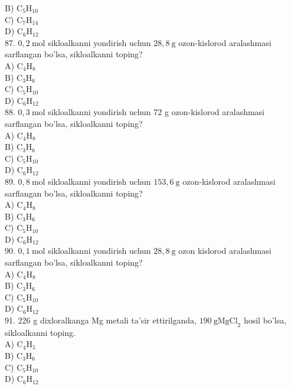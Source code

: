 B) $\mathrm{C}_{5} \mathrm{H}_{10}$\\
C) $\mathrm{C}_{7} \mathrm{H}_{14}$\\
D) $\mathrm{C}_{6} \mathrm{H}_{12}$\\
87. $0,2 \mathrm{~mol}$ sikloalkanni yondirish uchun $28,8 \mathrm{~g}$ ozon-kislorod aralashmasi sarflangan bo'lsa, sikloalkanni toping?\\
A) $\mathrm{C}_{4} \mathrm{H}_{8}$\\
B) $\mathrm{C}_{3} \mathrm{H}_{6}$\\
C) $\mathrm{C}_{5} \mathrm{H}_{10}$\\
D) $\mathrm{C}_{6} \mathrm{H}_{12}$\\
88. $0,3 \mathrm{~mol}$ sikloalkanni yondirish uchun 72 g ozon-kislorod aralashmasi sarflangan bo'lsa, sikloalkanni toping?\\
A) $\mathrm{C}_{4} \mathrm{H}_{8}$\\
B) $\mathrm{C}_{3} \mathrm{H}_{6}$\\
C) $\mathrm{C}_{5} \mathrm{H}_{10}$\\
D) $\mathrm{C}_{6} \mathrm{H}_{12}$\\
89. $0,8 \mathrm{~mol}$ sikloalkanni yondirish uchun $153,6 \mathrm{~g}$ ozon-kislorod aralashmasi sarflangan bo'lsa, sikloalkanni toping?\\
A) $\mathrm{C}_{4} \mathrm{H}_{8}$\\
B) $\mathrm{C}_{3} \mathrm{H}_{6}$\\
C) $\mathrm{C}_{5} \mathrm{H}_{10}$\\
D) $\mathrm{C}_{6} \mathrm{H}_{12}$\\
90. $0,1 \mathrm{~mol}$ sikloalkanni yondirish uchun $28,8 \mathrm{~g}$ ozon kislorod aralashmasi sarflangan bo'lsa, sikloalkanni toping?\\
A) $\mathrm{C}_{4} \mathrm{H}_{8}$\\
B) $\mathrm{C}_{3} \mathrm{H}_{6}$\\
C) $\mathrm{C}_{5} \mathrm{H}_{10}$\\
D) $\mathrm{C}_{6} \mathrm{H}_{12}$\\
91. 226 g dixloralkanga Mg metali ta'sir ettirilganda, $190 \mathrm{~g} \mathrm{MgCl}_{2}$ hosil bo'lsa, sikloalkanni toping.\\
A) $\mathrm{C}_{4} \mathrm{H}_{5}$\\
B) $\mathrm{C}_{3} \mathrm{H}_{6}$\\
C) $\mathrm{C}_{5} \mathrm{H}_{10}$\\
D) $\mathrm{C}_{6} \mathrm{H}_{12}$
